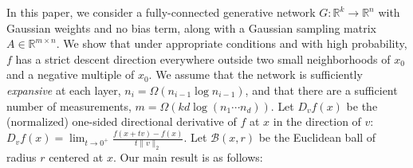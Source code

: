 \documentclass[11pt]{article}
\newcommand{\R}{\mathbb{R}}
\newcommand{\calB}{\mathcal{B}}
\newcommand{\red}[1]{{\color{black} #1}}
\newcommand{\xo}{x_0}
\begin{document}
In this paper, we consider a fully-connected generative network $G:\R^k \to \R^n$ with Gaussian weights and no bias term, along with a Gaussian sampling matrix $A \in \R^{m \times n}$.  We show that under appropriate conditions and with high probability, $f$ has a strict descent direction everywhere outside two small neighborhoods of $\xo$ and a negative multiple of $\xo$.  We assume that the network is sufficiently \textit{expansive} at each layer, $n_i = \Omega(n_{i-1} \log n_{i-1})$, and that there are a sufficient number of measurements, $m = \Omega(k d \log (n_1 \cdots n_d))$.  \red{Let $D_v f(x)$ be the (normalized) one-sided directional derivative of $f$ at $x$ in the direction of $v$: $D_v f(x) = \lim_{t \to 0^+} \frac{f(x + t v) - f(x)}{t \|v\|_2}$}. \red{Let $\calB(x,r)$ be the Euclidean ball of radius $r$ centered at $x$. } Our main result is as follows:
  
\end{document}
